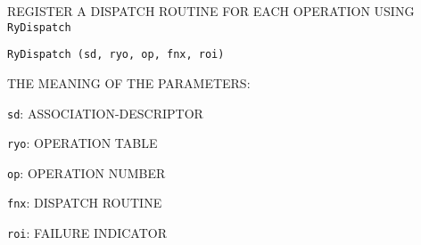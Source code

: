 %
%
%
%
%
%
%


\begin{bwslide}

\begin{nrtc}
\item	REGISTER A DISPATCH ROUTINE FOR EACH OPERATION USING \verb"RyDispatch"
\begin{verbatim}
RyDispatch (sd, ryo, op, fnx, roi)
\end{verbatim}

\item	THE MEANING OF THE PARAMETERS:
    \begin{nrtc}
    \item	\verb"sd": ASSOCIATION-DESCRIPTOR

    \item	\verb"ryo": OPERATION TABLE

    \item	\verb"op": OPERATION NUMBER

    \item	\verb"fnx": DISPATCH ROUTINE

    \item	\verb"roi": FAILURE INDICATOR
    \end{nrtc}
\end{nrtc}
\end{bwslide}


